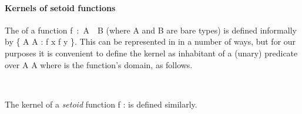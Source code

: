 \paragraph*{Kernels of setoid functions}
The  of a function \ab f~\as :~\ab A~~\ab B (where \ab A and \ab B are bare types) is defined
informally by \{  \ab A  \ab A \as : \ab f \ab x \as{=} \ab f \ab y \}.
This can be represented in \agda in a number of ways, but for our purposes it is
convenient to define the kernel as inhabitant of a (unary) predicate over \ab A  \ab A where \ab is
the function's domain, as follows.

\begin{code}%
\>[0]\AgdaSpace{}%
\AgdaSymbol{:}\AgdaSpace{}%
\AgdaSymbol{\{}\AgdaSpace{}%
\AgdaSymbol{:}\AgdaSpace{}%
\AgdaSpace{}%
\AgdaSymbol{\}\{}\AgdaSpace{}%
\AgdaSymbol{:}\AgdaSpace{}%
\AgdaSpace{}%
\AgdaSymbol{\}}\AgdaSpace{}%
\AgdaSpace{}%
\AgdaSpace{}%
\AgdaSpace{}%
\AgdaSpace{}%
\AgdaSpace{}%
\AgdaSymbol{(}\AgdaSpace{}%
\AgdaSpace{}%
\AgdaSymbol{)}\AgdaSpace{}%
\AgdaSpace{}%
\AgdaSpace{}%
\AgdaSymbol{(}\AgdaSpace{}%
\AgdaSpace{}%
\AgdaSymbol{)}\AgdaSpace{}%
\<%
\\
\>[0]\AgdaSpace{}%
\AgdaSpace{}%
\AgdaSpace{}%
\AgdaSymbol{(}\AgdaSpace{}%
\AgdaOperator{\AgdaInductiveConstructor{,}}\AgdaSpace{}%
\AgdaSymbol{)}\AgdaSpace{}%
\AgdaSymbol{=}\AgdaSpace{}%
\AgdaSpace{}%
\AgdaSpace{}%
\AgdaSpace{}%
\AgdaSpace{}%
\<%
\end{code}

The kernel of a \emph{setoid} function \ab f \as :    is
defined similarly.
\ifshort\else

